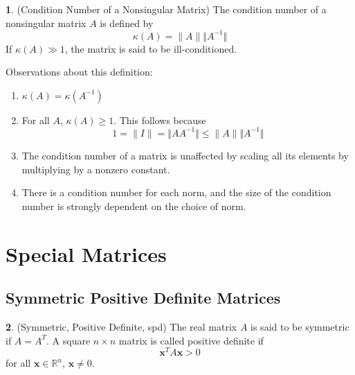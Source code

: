 \documentclass[12pt]{article}
\theoremstyle{definition}
\newtheorem{definition}{\color{NavyBlue}{\textbf{Definition}}}
\newcommand{\R}{\mathbb{R}}
\newcommand{\norm}[1]{\lVert#1\rVert}
\newcommand{\x}{\bm{x}}
\theoremstyle{definition}
\begin{document}
\begin{definition}(Condition Number of a Nonsingular Matrix)
The condition number of a nonsingular matrix $A$ is defined by 
\begin{equation}
	\kappa(A) = \norm{A} \Vert A^{-1} \Vert
\end{equation}
If $\kappa(A) \gg 1$, the matrix is said to be ill-conditioned.
\end{definition}
Observations about this definition:
\begin{enumerate}
	\item $\kappa(A) = \kappa(A^{-1})$ 
	\item For all $A$, $\kappa(A) \geq 1$. This follows because
	\begin{equation}
		1 = \norm{I} = \Vert A A^{-1} \Vert \leq \norm{A} \Vert A^{-1} \Vert
	\end{equation}
	\item The condition number of a matrix is unaffected by scaling all its elements by multiplying by a nonzero constant.
	\item There is a condition number for each norm, and the size of the condition number is strongly dependent on the choice of norm.
\end{enumerate}

\section{Special Matrices}
\subsection{Symmetric Positive Definite Matrices }
\begin{definition}(Symmetric, Positive Definite, spd)
The real matrix $A$ is said to be symmetric if $A = A^T$. A square $n \times n$ matrix is called positive definite if 
\begin{equation}
 	\x^T A \x > 0
\end{equation}
for all $\x \in \R^n$, $\x \neq 0$. 
\end{definition}
\end{document}

